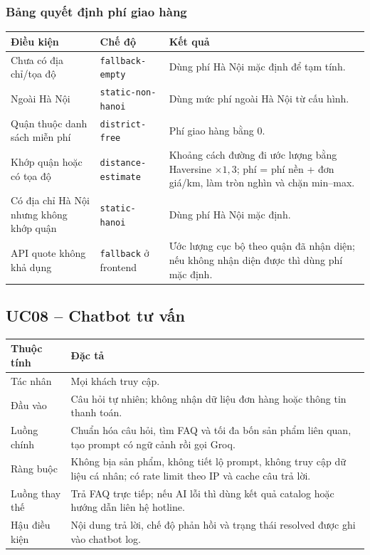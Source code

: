 \subsubsection{Bảng quyết định phí giao hàng}

\begin{longtable}{@{}L{0.29\textwidth}L{0.25\textwidth}L{0.38\textwidth}@{}}
  \toprule
  \textbf{Điều kiện} & \textbf{Chế độ} & \textbf{Kết quả} \\
  \midrule
  Chưa có địa chỉ/tọa độ & \texttt{fallback-empty} & Dùng phí Hà Nội mặc định để tạm tính. \\
  Ngoài Hà Nội & \texttt{static-non-hanoi} & Dùng mức phí ngoài Hà Nội từ cấu hình. \\
  Quận thuộc danh sách miễn phí & \texttt{district-free} & Phí giao hàng bằng 0. \\
  Khớp quận hoặc có tọa độ & \texttt{distance-estimate} & Khoảng cách đường đi ước lượng bằng Haversine $\times 1{,}3$; phí = phí nền + đơn giá/km, làm tròn nghìn và chặn min--max. \\
  Có địa chỉ Hà Nội nhưng không khớp quận & \texttt{static-hanoi} & Dùng phí Hà Nội mặc định. \\
  API quote không khả dụng & \texttt{fallback} ở frontend & Ước lượng cục bộ theo quận đã nhận diện; nếu không nhận diện được thì dùng phí mặc định. \\
  \bottomrule
\end{longtable}

\subsection{UC08 -- Chatbot tư vấn}

\begin{longtable}{@{}L{0.23\textwidth}L{0.69\textwidth}@{}}
  \toprule
  \textbf{Thuộc tính} & \textbf{Đặc tả} \\
  \midrule
  Tác nhân & Mọi khách truy cập. \\
  Đầu vào & Câu hỏi tự nhiên; không nhận dữ liệu đơn hàng hoặc thông tin thanh toán. \\
  Luồng chính & Chuẩn hóa câu hỏi, tìm FAQ và tối đa bốn sản phẩm liên quan, tạo prompt có ngữ cảnh rồi gọi Groq. \\
  Ràng buộc & Không bịa sản phẩm, không tiết lộ prompt, không truy cập dữ liệu cá nhân; có rate limit theo IP và cache câu trả lời. \\
  Luồng thay thế & Trả FAQ trực tiếp; nếu AI lỗi thì dùng kết quả catalog hoặc hướng dẫn liên hệ hotline. \\
  Hậu điều kiện & Nội dung trả lời, chế độ phản hồi và trạng thái resolved được ghi vào chatbot log. \\
  \bottomrule
\end{longtable}

